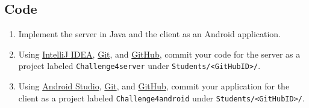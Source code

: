 \documentclass[11pt]{article}
\begin{document}
\subsection*{Code}

\begin{enumerate}
\item Implement the server in Java and the client as an Android application.
\item Using \href{https://www.jetbrains.com/idea/}{IntelliJ IDEA}, \href{http://git-scm.com/}{Git}, and \href{https://GitHub.com}{GitHub}, commit your code for the server as a project labeled \texttt{Challenge4server} under \texttt{Students/<GitHubID>/}.
\item Using \href{http://developer.android.com/sdk/index.html}{Android Studio}, \href{http://git-scm.com/}{Git}, and \href{https://GitHub.com}{GitHub}, commit your application for the client as a project labeled \texttt{Challenge4android} under \texttt{Students/<GitHubID>/}.
\end{enumerate}
\end{document}

